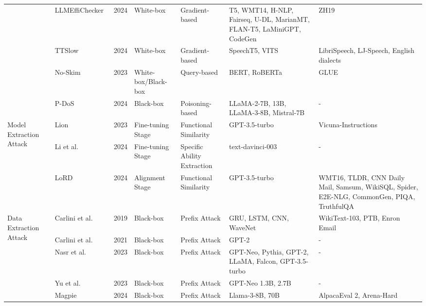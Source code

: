 \begin{table*}[htp]
{\begin{tabular}{p{}p{}p{}p{}p{}p{}p{}}
& LLMEffiChecker~\cite{feng2024llmeffichecker} & 2024 & White-box & Gradient-based & T5, WMT14, H-NLP, Fairseq, U-DL, MarianMT, FLAN-T5, LaMiniGPT,  CodeGen & ZH19 \\
& \cellcolor{gray!15!}TTSlow~\cite{gao2024ttslow} & \cellcolor{gray!15!}2024 & \cellcolor{gray!15!}White-box & \cellcolor{gray!15!}Gradient-based & \cellcolor{gray!15!}SpeechT5, VITS & \cellcolor{gray!15!}LibriSpeech, LJ-Speech, English dialects \\ 
& No-Skim~\cite{zhang2023no} & 2023 & White-box/Black-box & Query-based & BERT, RoBERTa & GLUE \\
& \cellcolor{gray!15!}P-DoS\cite{gao2024denial} & \cellcolor{gray!15!}2024 & \cellcolor{gray!15!}Black-box & \cellcolor{gray!15!}Poisoning-based & \cellcolor{gray!15!}LLaMA-2-7B, 13B, LLaMA-3-8B, Mistral-7B & \cellcolor{gray!15!}- \\
\hline
\multirow{2}{0.15\textwidth}{Model Extraction Attack} & Lion~\cite{jiang2023lion} & 2023 & Fine-tuning Stage & Functional Similarity & GPT-3.5-turbo & Vicuna-Instructions \\
& \cellcolor{gray!15!}Li et al.~\cite{li2024extracting} & \cellcolor{gray!15!}2024 & \cellcolor{gray!15!}Fine-tuning Stage & \cellcolor{gray!15!}Specific Ability Extraction & \cellcolor{gray!15!}text-davinci-003 & \cellcolor{gray!15!}- \\ 
& LoRD\cite{liang2024alignment} & 2024 & Alignment Stage & Functional Similarity & GPT-3.5-turbo &  WMT16, TLDR, CNN Daily Mail, Samsum, WikiSQL, Spider, E2E-NLG, CommonGen, PIQA, TruthfulQA\\
\hline
\multirow{13}{0.1\textwidth}{Data Extraction Attack} & \cellcolor{gray!15!}Carlini et al.~\cite{carlini2019secret} & \cellcolor{gray!15!}2019 & \cellcolor{gray!15!}Black-box & \cellcolor{gray!15!}Prefix Attack & \cellcolor{gray!15!}GRU, LSTM, CNN, WaveNet & \cellcolor{gray!15!}WikiText-103, PTB, Enron Email \\ 
& Carlini et al.~\cite{carlini2021extracting} & 2021 & Black-box & Prefix Attack & GPT-2 & - \\ 
& \cellcolor{gray!15!}Nasr et al.~\cite{nasr2023scalable} & \cellcolor{gray!15!}2023 & \cellcolor{gray!15!}Black-box & \cellcolor{gray!15!}Prefix Attack & \cellcolor{gray!15!}GPT-Neo, Pythia, GPT-2, LLaMA, Falcon, GPT-3.5-turbo & \cellcolor{gray!15!}-  \\ 
& Yu et al.\cite{yu2023bag} & 2023 & Black-box & Prefix Attack & GPT-Neo 1.3B, 2.7B & - \\
& \cellcolor{gray!15!}Magpie~\cite{xu2024magpie} & \cellcolor{gray!15!}2024 & \cellcolor{gray!15!}Black-box & \cellcolor{gray!15!}Prefix Attack & \cellcolor{gray!15!}Llama-3-8B, 70B & \cellcolor{gray!15!}AlpacaEval 2, Arena-Hard \\ 

\end{tabular}}
\end{table*}

